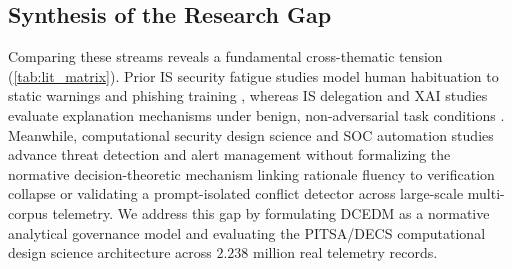 \documentclass[11pt,a4paper]{article}
\begin{document}
\subsection{Synthesis of the Research Gap}
\label{subsec:lit_gap}

Comparing these streams reveals a fundamental cross-thematic tension (\cref{tab:lit_matrix}). Prior IS security fatigue studies model human habituation to static warnings and phishing training \citep{anderson2016warning, vance2018fog, cram2021technostress, jensen2022improving, hsu2024proactive}, whereas IS delegation and XAI studies evaluate explanation mechanisms under benign, non-adversarial task conditions \citep{baird2021next, fugener2022cognitive, lebovitz2022engage, revilla2023human, tutun2024explainable, bag2025enhancing, ansari2026partner, taudien2026effect}. Meanwhile, computational security design science and SOC automation studies advance threat detection and alert management \citep{ebrahimi2020semi, li2022assessing, naseer2023enabling, ampel2024improving, tilbury2024automation, tariq2025alert, srinivas2025ai, bartal2026alert} without formalizing the normative decision-theoretic mechanism linking rationale fluency to verification collapse or validating a prompt-isolated conflict detector across large-scale multi-corpus telemetry. We address this gap by formulating DCEDM as a normative analytical governance model and evaluating the PITSA/DECS computational design science architecture across $2.238$ million real telemetry records.
\end{document}
